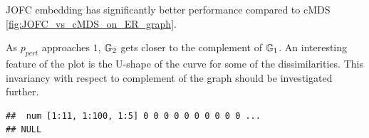 \documentclass[12pt,oneside,final]{thesis}\usepackage[]{graphicx}\usepackage[]{color}
\makeatletter
\newenvironment{kframe}{%
 \def\at@end@of@kframe{}%
 \ifinner\ifhmode%
  \def\at@end@of@kframe{\end{minipage}}%
  \begin{minipage}{\columnwidth}%
 \fi\fi%
 \def\FrameCommand##1{\hskip\@totalleftmargin \hskip-\fboxsep
 \colorbox{shadecolor}{##1}\hskip-\fboxsep
     \hskip-\linewidth \hskip-\@totalleftmargin \hskip\columnwidth}%
 \MakeFramed {\advance\hsize-\width
   \@totalleftmargin\z@ \linewidth\hsize
   \@setminipage}}%
 {\par\unskip\endMakeFramed%
 \at@end@of@kframe}
\newenvironment{knitrout}{}{} %
\makeatother
\begin{document}
JOFC embedding  has significantly better performance compared to cMDS \ref{fig:JOFC_vs_cMDS_on_ER_graph}. 



As $p_{pert}$ approaches $1$, $\mathbb{G}_2$ gets closer to the complement of $\mathbb{G}_1$. An interesting feature of the plot is the U-shape of the curve for some of the dissimilarities. This invariancy with respect to complement of the graph should be investigated further.  






\begin{knitrout}
\color{fgcolor}\begin{kframe}


{\ttfamily\noindent\bfseries{}}\end{kframe}
\end{knitrout}



\begin{knitrout}
\color{fgcolor}\begin{kframe}


{\ttfamily\noindent\color{warningcolor}{\#\# Warning: there is no package called 'arrayhelpers'}}\begin{verbatim}
##  num [1:11, 1:100, 1:5] 0 0 0 0 0 0 0 0 0 0 ...
## NULL
\end{verbatim}


{\ttfamily\noindent\bfseries{}}

{\ttfamily\noindent\bfseries\color{errorcolor}{\#\# Error: object 'nc.jofc.w.lf' not found}}

{\ttfamily\noindent\bfseries{}}

{\ttfamily\noindent\bfseries{}}\end{kframe}
\end{knitrout}
\end{document}

